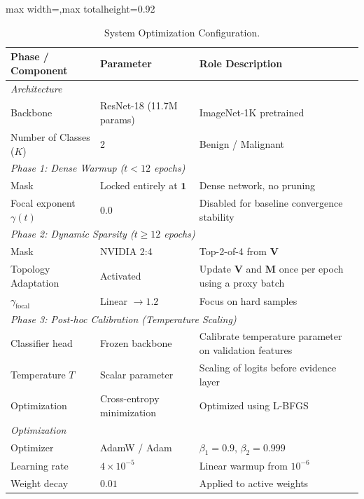 \documentclass[letterpaper]{article} %
\begin{document}
\begin{table}[h]
\centering
\caption{System Optimization Configuration.}
\label{tab:config}
\scriptsize
\renewcommand{\arraystretch}{0.9}
\setlength{\tabcolsep}{2.0pt}
\begin{adjustbox}{max width=\columnwidth,max totalheight=0.92\textheight}
\begin{tabular}{@{}p{}p{}p{}@{}}
\toprule
\textbf{Phase / Component} & \textbf{Parameter} & \textbf{Role Description} \\
\midrule
\multicolumn{3}{l}{\emph{Architecture}} \\
Backbone & ResNet-18 (11.7M params) & ImageNet-1K pretrained \\
Number of Classes ($K$) & 2 & Benign / Malignant \\
\midrule
\multicolumn{3}{l}{\emph{Phase 1: Dense Warmup ($t < 12$ epochs)}} \\
Mask & Locked entirely at $\bm{1}$ & Dense network, no pruning \\
Focal exponent $\gamma(t)$ & $0.0$ & Disabled for baseline convergence stability \\
\midrule
\multicolumn{3}{l}{\emph{Phase 2: Dynamic Sparsity ($t \ge 12$ epochs)}} \\
Mask & NVIDIA 2:4 & Top-2-of-4 from $\bm{V}$ \\
Topology Adaptation & Activated & Update $\bm{V}$ and $\bm{M}$ once per epoch using a proxy batch \\
$\gamma_{\text{focal}}$ & Linear $\to 1.2$ & Focus on hard samples \\
\midrule
\multicolumn{3}{l}{\emph{Phase 3: Post-hoc Calibration (Temperature Scaling)}} \\
Classifier head & Frozen backbone & Calibrate temperature parameter on validation features \\
Temperature $T$ & Scalar parameter & Scaling of logits before evidence layer \\
Optimization & Cross-entropy minimization & Optimized using L-BFGS \\
\midrule
\multicolumn{3}{l}{\emph{Optimization}} \\
Optimizer & AdamW / Adam~\cite{loshchilov2019decoupled,kingma2015adam} & $\beta_1=0.9$, $\beta_2=0.999$ \\
Learning rate & $4 \times 10^{-5}$ & Linear warmup from $10^{-6}$ \\
Weight decay & $0.01$ & Applied to active weights \\

\end{tabular}
\end{adjustbox}
\end{table}
\end{document}
